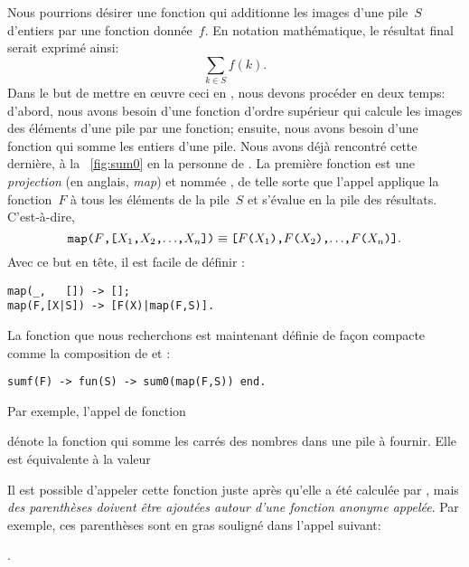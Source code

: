 Nous pourrions désirer une fonction qui additionne les images d'une
pile~\(S\) d'entiers par une fonction donnée~\(f\). En notation
mathématique, le résultat final serait exprimé ainsi:
\begin{equation*}
\sum_{k \in S}{f(k)}.
\end{equation*}
Dans le but de mettre en {\oe}uvre ceci en \Erlang, nous devons
procéder en deux temps: d'abord, nous avons besoin d'une fonction
d'ordre supérieur qui calcule les images des éléments d'une pile par
une fonction; ensuite, nous avons besoin d'une fonction qui somme les
entiers d'une pile. Nous avons déjà rencontré cette dernière, à la
\fig~\vref{fig:sum0} en la personne de . La première
fonction est une \emph{projection} (en anglais, \emph{map}) et nommée
, de telle sorte que l'appel 
applique la fonction~\(F\) à tous les éléments de la pile~\(S\) et
s'évalue en la pile des résultats. C'est-à-dire,
\begin{equation*}
\texttt{map(\(F\),[\(X_1\),\(X_2\),\(\ldots\),\(X_{n}\)])}
\equiv
\texttt{[\(F\)(\(X_1\)),\(F\)(\(X_2\)),\(\ldots\),\(F\)(\(X_{n}\))]}.
\end{equation*}
Avec ce but en tête, il est facile de définir :
\begin{verbatim}
map(_,   []) -> [];
map(F,[X|S]) -> [F(X)|map(F,S)].
\end{verbatim}
La fonction que nous recherchons est maintenant définie de façon
compacte comme la composition de  et :
\begin{verbatim}
sumf(F) -> fun(S) -> sum0(map(F,S)) end.
\end{verbatim}
Par exemple, l'appel de fonction
\begin{center}
\end{center}
dénote la fonction qui somme les carrés des nombres dans une pile à
fournir. Elle est équivalente à la valeur
\begin{center}
\end{center}
Il est possible d'appeler cette fonction juste après qu'elle a été
calculée par , mais \emph{des parenthèses doivent être
  ajoutées autour d'une fonction anonyme appelée}. Par exemple, ces
parenthèses sont en gras souligné dans l'appel suivant:
\begin{center}
.
\end{center}
